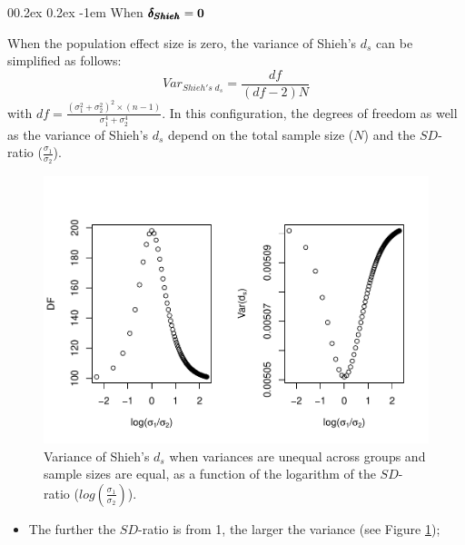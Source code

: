 \documentclass[
  english,
  man,mask]{apa6}
\makeatletter
\providecommand{\tightlist}{%
  \setlength{\itemsep}{0pt}\setlength{\parskip}{0pt}}
\let\oldparagraph\paragraph
\renewcommand{\paragraph}[1]{\oldparagraph{#1}\mbox{}}
\renewcommand{\paragraph}{\@startsection{paragraph}{4}{\parindent}%
  {0\baselineskip \@plus 0.2ex \@minus 0.2ex}%
  {-1em}%
  {\normalfont\normalsize\bfseries\itshape\typesectitle}}
\makeatother
\begin{document}
\hypertarget{when-bf-pmbdelta_shieh0-1}{%
\paragraph{\texorpdfstring{When \(\bf \pmb{\delta_{Shieh}}=0\)}{When \textbackslash bf \textbackslash pmb\{\textbackslash delta\_\{Shieh\}\}=0}}\label{when-bf-pmbdelta_shieh0-1}}

When the population effect size is zero, the variance of Shieh's \(d_s\) can be simplified as follows:
\[Var_{Shieh's \; d_s} = \frac{df}{(df-2)N}\]
with \(df = \frac{(\sigma_1^2+\sigma_2^2)^2 \times (n-1)}{\sigma_1^4+\sigma_2^4}\). In this configuration, the degrees of freedom as well as the variance of Shieh's \(d_s\) depend on the total sample size (\(N\)) and the \(SD\)-ratio (\(\frac{\sigma_1}{\sigma_2}\)).

\begin{figure}
\centering
\includegraphics{Theoretical-Variance-of-all-estimators-as-a-function-of-population-parameters_files/figure-latex/varshiehhetbalSDratio2-1.pdf}
\caption{\label{fig:varshiehhetbalSDratio2}Variance of Shieh's \(d_s\) when variances are unequal across groups and sample sizes are equal, as a function of the logarithm of the \(SD\)-ratio (\(log \left( \frac{\sigma_1}{\sigma_2} \right)\)).}
\end{figure}

\begin{itemize}
\tightlist
\item
  The further the \(SD\)-ratio is from 1, the larger the variance (see Figure \ref{fig:varshiehhetbalSDratio2});
\end{itemize}
\end{document}
